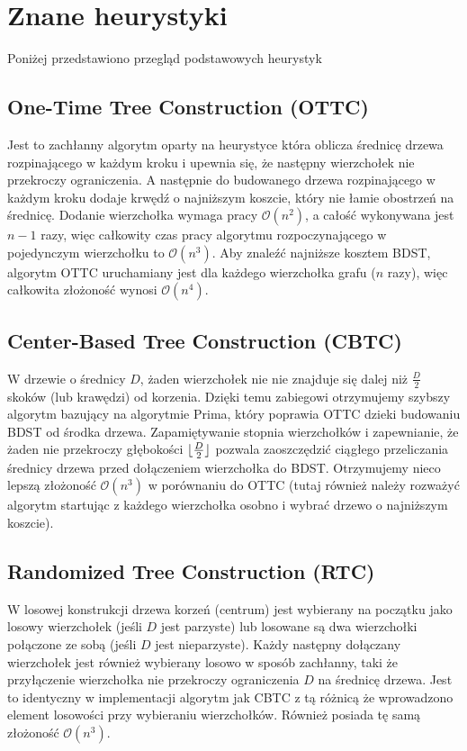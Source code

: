 \section{Znane heurystyki}
Poniżej przedstawiono przegląd podstawowych heurystyk 

\subsection{One-Time Tree Construction (OTTC)}

Jest to zachłanny algorytm oparty na heurystyce która oblicza średnicę drzewa rozpinającego w każdym kroku i upewnia się, że następny wierzchołek nie przekroczy ograniczenia. A następnie do budowanego drzewa rozpinającego w każdym kroku dodaje krwędź o najniższym koszcie, który nie łamie obostrzeń na średnicę. Dodanie wierzchołka wymaga pracy $\mathcal{O}(n^2)$, a całość wykonywana jest $n-1$ razy, więc całkowity czas pracy algorytmu rozpoczynającego w pojedynczym wierzchołku to $\mathcal{O}(n^3)$. Aby znaleźć najniższe kosztem BDST, algorytm OTTC uruchamiany jest dla każdego wierzchołka grafu ($n$ razy), więc całkowita złożoność wynosi $\mathcal{O}(n^4)$. 

\subsection{Center-Based Tree Construction (CBTC)}
W drzewie o średnicy $D$, żaden wierzchołek nie nie znajduje się dalej niż $\frac{D}{2}$ skoków (lub krawędzi) od korzenia. Dzięki temu zabiegowi otrzymujemy szybszy algorytm bazujący na algorytmie Prima, który poprawia OTTC dzieki budowaniu BDST od środka drzewa. Zapamiętywanie stopnia wierzchołków i zapewnianie, że żaden nie przekroczy głębokości $\lfloor\frac{D}{2}\rfloor$ pozwala zaoszczędzić ciągłego przeliczania średnicy drzewa przed dołączeniem wierzchołka do BDST. Otrzymujemy nieco lepszą złożoność $\mathcal{O}(n^3)$ w porównaniu do OTTC (tutaj również należy rozważyć algorytm startując z każdego wierzchołka osobno i wybrać drzewo o najniższym koszcie).

\subsection{Randomized Tree Construction (RTC)}
W losowej konstrukcji drzewa korzeń (centrum) jest wybierany na początku jako losowy wierzchołek (jeśli $D$ jest parzyste) lub losowane są dwa wierzchołki połączone ze sobą (jeśli $D$ jest nieparzyste). Każdy następny dołączany wierzchołek jest również wybierany losowo w sposób zachłanny, taki że przyłączenie wierzchołka nie przekroczy ograniczenia $D$ na średnicę drzewa. Jest to identyczny w implementacji algorytm jak CBTC z tą różnicą że wprowadzono element losowości przy wybieraniu wierzchołków. Również posiada tę samą złożoność $\mathcal{O}(n^3)$.

